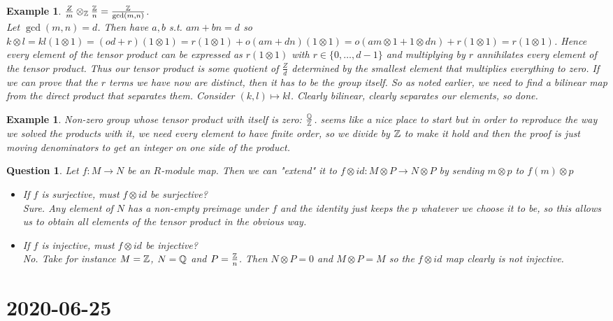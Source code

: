 \documentclass[a4paper]{article}
\newtheorem{exmp}[thm]{Example}
\newtheorem{que}[thm]{Question}
\begin{document}
\begin{exmp}
    $\frac{Z}{m}\otimes _{\mathbb{Z}} \frac{\mathbb{Z}}{n}=\frac{\mathbb{Z}}{\gcd\left( m,n \right) }$.
    \\Let $\gcd(m,n)=d$. Then have  $a,b$ s.t. $am+bn=d$ so  $k\otimes l=kl (1\otimes 1)=(od+r)\left( 1\otimes 1 \right) =r\left( 1\otimes 1 \right) +o\left( am+dn \right) \left( 1\otimes 1 \right) =o\left( am\otimes 1 + 1\otimes dn \right)+r\left( 1\otimes 1 \right) =r\left( 1\otimes 1 \right)  $. Hence every element of the tensor product can be expressed as $r\left( 1\otimes 1 \right) $ with $r\in \{0, \ldots ,d-1\}$ and multiplying by $r$ annihilates every element of the tensor product. Thus our tensor product is some quotient of  $\frac{Z}{d}$ determined by the smallest element that multiplies everything to zero. If we can prove that the  $r$ terms we have now are distinct, then it has to be the group itself. So as noted earlier, we need to find a bilinear map from the direct product that separates them. Consider $\left( k,l \right)\mapsto kl $. Clearly bilinear, clearly separates our elements, so done.
    
\end{exmp}
\begin{exmp}
    Non-zero group whose tensor product with itself is zero: $\frac{\mathbb{Q}}{\mathbb{Z}}$. \Q seems like a nice place to start but in order to reproduce the way we solved the products with it, we need every element to have finite order, so we divide by $\mathbb{Z}$ to make it hold and then the proof is just moving denominators to get an integer on one side of the product.
\end{exmp}
\begin{que}
    Let $f:M\to N$ be an $R$-module map. Then we can  "extend" it to $f\otimes id : M\otimes P\to N\otimes P$ by sending $m\otimes p$ to $f(m)\otimes p$
    \begin{itemize}
        \item If $f$ is surjective, must $f\otimes id$ be surjective?\\
            Sure. Any element of $N$ has a non-empty preimage under $f$ and the identity just keeps the $p$ whatever we choose it to be, so this allows us to obtain all elements of the tensor product in the obvious way.
        \item If $f$ is injective, must $f\otimes id$ be injective?\\
            No. Take for instance $M=\mathbb{Z}$, $N=\mathbb{Q}$ and $P= \frac{\mathbb{Z}}{n}$. Then $N\otimes P={0}$ and $M\otimes P=M$ so the $f\otimes id$ map clearly is not injective.       
    \end{itemize}
\end{que}
\section*{2020-06-25}
\end{document}
